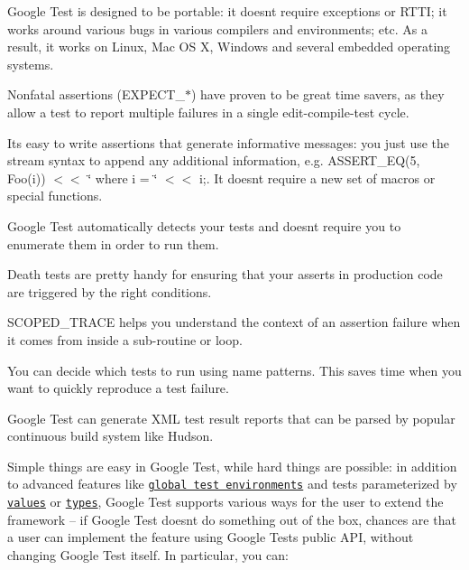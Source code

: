 \begin{DoxyItemize}
\item Google Test is designed to be portable\+: it doesn\textquotesingle{}t require exceptions or R\+T\+TI; it works around various bugs in various compilers and environments; etc. As a result, it works on Linux, Mac OS X, Windows and several embedded operating systems.
\item Nonfatal assertions ({\ttfamily E\+X\+P\+E\+C\+T\+\_\+$\ast$}) have proven to be great time savers, as they allow a test to report multiple failures in a single edit-\/compile-\/test cycle.
\item It\textquotesingle{}s easy to write assertions that generate informative messages\+: you just use the stream syntax to append any additional information, e.\+g. {\ttfamily A\+S\+S\+E\+R\+T\+\_\+\+E\+Q(5, Foo(i)) $<$$<$ \char`\"{} where i = \char`\"{} $<$$<$ i;}. It doesn\textquotesingle{}t require a new set of macros or special functions.
\item Google Test automatically detects your tests and doesn\textquotesingle{}t require you to enumerate them in order to run them.
\item Death tests are pretty handy for ensuring that your asserts in production code are triggered by the right conditions.
\item {\ttfamily S\+C\+O\+P\+E\+D\+\_\+\+T\+R\+A\+CE} helps you understand the context of an assertion failure when it comes from inside a sub-\/routine or loop.
\item You can decide which tests to run using name patterns. This saves time when you want to quickly reproduce a test failure.
\item Google Test can generate X\+ML test result reports that can be parsed by popular continuous build system like Hudson.
\item Simple things are easy in Google Test, while hard things are possible\+: in addition to advanced features like \href{advanced.md#global-set-up-and-tear-down}{\tt global test environments} and tests parameterized by \href{advanced.md#value-parameterized-tests}{\tt values} or \href{docs/advanced.md#typed-tests}{\tt types}, Google Test supports various ways for the user to extend the framework -- if Google Test doesn\textquotesingle{}t do something out of the box, chances are that a user can implement the feature using Google Test\textquotesingle{}s public A\+PI, without changing Google Test itself. In particular, you can\+:
\begin{DoxyItemize}

\end{DoxyItemize}
\end{DoxyItemize}
